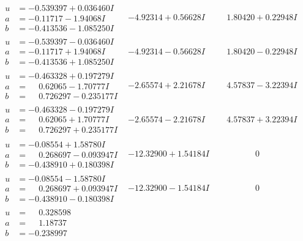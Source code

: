 \documentclass[1p]{elsarticle_modified}
\theoremstyle{definition}
\begin{document}
$$\begin{array}{c|c|c}
\begin{aligned}
u &= -0.539397 + 0.036460 I \\
a &= -0.11717 - 1.94068 I \\
b &= -0.413536 - 1.085250 I\end{aligned}
 & -4.92314 + 0.56628 I & \phantom{-}1.80420 + 0.22948 I \\ \hline\begin{aligned}
u &= -0.539397 - 0.036460 I \\
a &= -0.11717 + 1.94068 I \\
b &= -0.413536 + 1.085250 I\end{aligned}
 & -4.92314 - 0.56628 I & \phantom{-}1.80420 - 0.22948 I \\ \hline\begin{aligned}
u &= -0.463328 + 0.197279 I \\
a &= \phantom{-}0.62065 - 1.70777 I \\
b &= \phantom{-}0.726297 - 0.235177 I\end{aligned}
 & -2.65574 + 2.21678 I & \phantom{-}4.57837 - 3.22394 I \\ \hline\begin{aligned}
u &= -0.463328 - 0.197279 I \\
a &= \phantom{-}0.62065 + 1.70777 I \\
b &= \phantom{-}0.726297 + 0.235177 I\end{aligned}
 & -2.65574 - 2.21678 I & \phantom{-}4.57837 + 3.22394 I \\ \hline\begin{aligned}
u &= -0.08554 + 1.58780 I \\
a &= \phantom{-}0.268697 - 0.093947 I \\
b &= -0.438910 + 0.180398 I\end{aligned}
 & -12.32900 + 1.54184 I & \phantom{-0.000000 } 0 \\ \hline\begin{aligned}
u &= -0.08554 - 1.58780 I \\
a &= \phantom{-}0.268697 + 0.093947 I \\
b &= -0.438910 - 0.180398 I\end{aligned}
 & -12.32900 - 1.54184 I & \phantom{-0.000000 } 0 \\ \hline\begin{aligned}
u &= \phantom{-}0.328598\phantom{ +0.000000I} \\
a &= \phantom{-}1.18737\phantom{ +0.000000I} \\
b &= -0.238997\phantom{ +0.000000I}\end{aligned}

\end{array}$$
\end{document}
